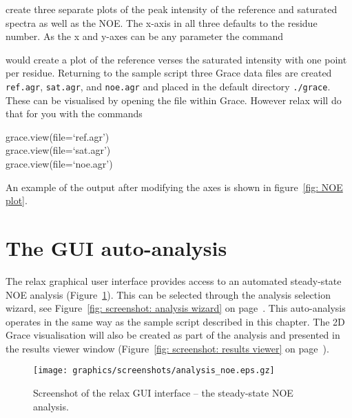 create three separate plots of the peak intensity of the reference and saturated spectra as well as the NOE.  The x-axis in all three defaults to the residue number.  As the x and y-axes can be any parameter the command


would create a plot of the reference verses the saturated intensity with one point per residue.  Returning to the sample script three Grace data files are created \texttt{ref.agr}, \texttt{sat.agr}, and \texttt{noe.agr} and placed in the default directory \texttt{./grace}.  These can be visualised by opening the file within Grace.  However relax will do that for you with the commands

\begin{exampleenv}
grace.view(file=`ref.agr') \\
grace.view(file=`sat.agr') \\
grace.view(file=`noe.agr')
\end{exampleenv}

An example of the output after modifying the axes is shown in figure~\ref{fig: NOE plot}.



\section{The GUI auto-analysis}

The relax graphical user interface provides access to an automated steady-state NOE analysis (Figure~\ref{fig: screenshot: NOE analysis}).  This can be selected through the analysis selection wizard, see Figure~\ref{fig: screenshot: analysis wizard} on page~\pageref{fig: screenshot: analysis wizard}.  This auto-analysis operates in the same way as the sample script described in this chapter.  The 2D Grace visualisation will also be created as part of the analysis and presented in the results viewer window (Figure~\ref{fig: screenshot: results viewer} on page~\pageref{fig: screenshot: results viewer}).

\begin{figure}
\centerline{\texttt{[image: graphics/screenshots/analysis\_noe.eps.gz]}}
\caption[GUI screenshot -- NOE analysis]{Screenshot of the relax GUI interface -- the steady-state NOE analysis.}\label{fig: screenshot: NOE analysis}
\end{figure}
